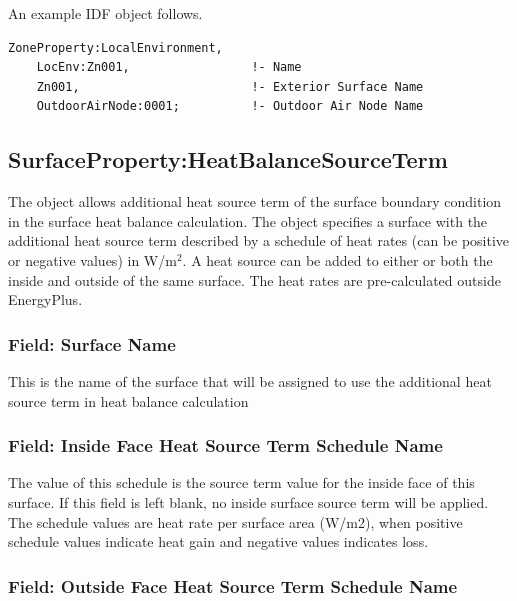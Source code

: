 An example IDF object follows.

\begin{lstlisting}
ZoneProperty:LocalEnvironment,
    LocEnv:Zn001,                 !- Name
    Zn001,                        !- Exterior Surface Name
    OutdoorAirNode:0001;          !- Outdoor Air Node Name
\end{lstlisting}

\subsection{SurfaceProperty:HeatBalanceSourceTerm}\label{surfacePropertyHeatBalanceSourceTerm}

The object allows additional heat source term of the surface boundary condition in the surface heat balance calculation. The object specifies a surface with the additional heat source term described by a schedule of heat rates (can be positive or negative values) in W/m\(^2\). A heat source can be added	to either or both the inside and outside of the same surface. The heat rates are pre-calculated outside EnergyPlus.

\subsubsection{Field: Surface Name}\label{surfacePropertyHeatBalanceSourceTerm-field-surface-name}

This is the name of the surface that will be assigned to use the additional heat source term in heat balance calculation

\subsubsection{Field: Inside Face Heat Source Term Schedule Name}\label{field-inside-heat-source-term-schedule-name}

The value of this schedule is the source term value for the inside face of this surface. If this field is left blank, no inside surface source term will be applied. The schedule values are heat rate per surface area (W/m2), when positive schedule values indicate heat gain and negative values indicates loss.

\subsubsection{Field: Outside Face Heat Source Term Schedule Name}\label{field-outside-heat-source-term-schedule-name}

